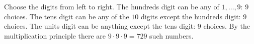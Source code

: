 Choose the digits from left to right. The hundreds digit can be any of $1,\dots,9$: $9$ choices. The tens digit can be any of the $10$ digits except the hundreds digit: $9$ choices. The units digit can be anything except the tens digit: $9$ choices. By the multiplication principle there are $9\cdot9\cdot9=\boxed{729}$ such numbers.
